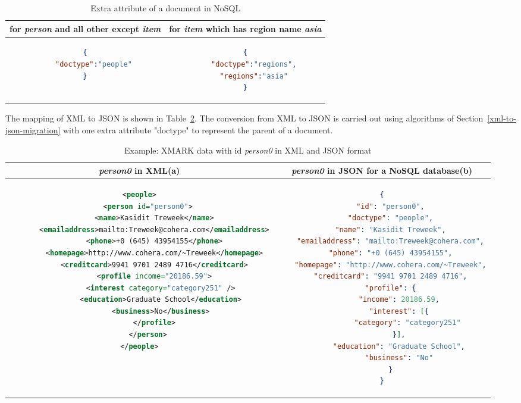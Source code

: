 \begin{longtable}{c|c}
	\caption{ Extra attribute of a document in NoSQL}
	\label{tbl:xmark-item-type}\\
    {for \textit{person} and all other except \textit{item} } & {for \textit{item} which has region name \textit{asia}}\\
	\hline
\begin{minipage}{.4\textwidth}
\begin{lstlisting}[language=JSON]
{
	"doctype":"people"
}
\end{lstlisting}
\end{minipage} &
\begin{minipage}{.4\textwidth}
\begin{lstlisting}[language=JSON]
{
	"doctype":"regions",
	"regions":"asia"
}
\end{lstlisting}
\end{minipage}
\end{longtable}

The mapping of XML to JSON is shown in Table~\ref{tbl:xmark-xml-json}. The conversion from XML to JSON is carried out using  algorithms of Section~\ref{xml-to-json-migration} with one extra attribute "doctype" to represent the parent of a document.
\begin{longtable}{c|c}
	\caption{Example: XMARK data with id \textit{person0} in XML and JSON format }
	\label{tbl:xmark-xml-json}\\
	{\textit{person0}} in XML(a) & {\textit{person0}} in JSON for a NoSQL database(b)\\
	\hline
	\begin{minipage}{.4\textwidth}
\centering		
\begin{lstlisting}[language=XML,basicstyle = \tiny,label=code:xml-nosql-person0]
<people>
    <person id="person0">
       <name>Kasidit Treweek</name>
       <emailaddress>mailto:Treweek@cohera.com</emailaddress>
       <phone>+0 (645) 43954155</phone>
       <homepage>http://www.cohera.com/~Treweek</homepage>
       <creditcard>9941 9701 2489 4716</creditcard>
       <profile income="20186.59">
          <interest category="category251" />
          <education>Graduate School</education>
          <business>No</business>
       </profile>
    </person>
</people>
\end{lstlisting}	
	\end{minipage} &
	\begin{minipage}{.55\textwidth}
		\centering
		\begin{lstlisting}[language=JSON, basicstyle =\tiny, label=code:json-nosql-person0]
{
	"id": "person0",
	"doctype": "people",
	"name": "Kasidit Treweek",
	"emailaddress": "mailto:Treweek@cohera.com",
	"phone": "+0 (645) 43954155",
	"homepage": "http://www.cohera.com/~Treweek",
	"creditcard": "9941 9701 2489 4716",
	"profile": {
		"income": 20186.59,
		"interest": [{
			"category": "category251"
		}],
		"education": "Graduate School",
		"business": "No"
	}
}
		\end{lstlisting}
	\end{minipage}\\
\end{longtable}

